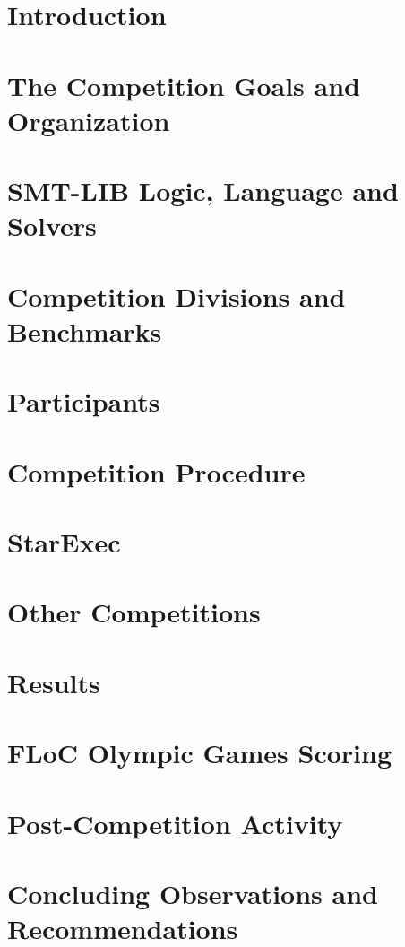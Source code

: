 \documentclass[twoside,11pt]{article}
\begin{document}
\section{Introduction}
\label{sec:intro}

\section{The Competition Goals and Organization}
\label{sec:goals}

\section{SMT-LIB Logic, Language and Solvers}
\label{sec:context}

\section{Competition Divisions and Benchmarks}
\label{sec:benchmarks}

\section{Participants}
\label{sec:participants}

\section{Competition Procedure}
\label{sec:procedure}

\section{StarExec}
\label{sec:starexec}

\section{Other Competitions}
\label{sec:OtherCompetitions}

\section{Results}
\label{sec:results}

\section{FLoC Olympic Games Scoring}
\label{sec:floc}

\section{Post-Competition Activity}
\label{sec:post}

\section{Concluding Observations and Recommendations}
\label{sec:conclusions}


%
\end{document}
